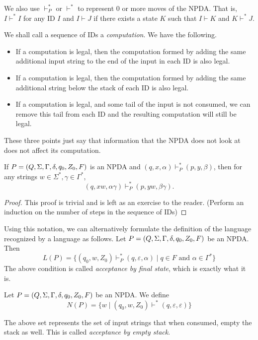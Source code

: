 We also use $\vdash^*_P$ or $\vdash^*$ to represent $0$ or more moves of the NPDA. That is, $I\vdash^* I$ for any ID $I$ and $I\vdash J$ if there exists a state $K$ such that $I\vdash K$ and $K\vdash^* J$.

\vspace{3mm}
We shall call a sequence of IDs a \textit{computation}. We have the following.
\begin{itemize}
    \item If a computation is legal, then the computation formed by adding the same additional input string to the end of the input in each ID is also legal.
    \item If a computation is legal, then the computation formed by adding the same additional string below the stack of each ID is also legal.
    \item If a computation is legal, and some tail of the input is not consumed, we can remove this tail from each ID and the resulting computation will still be legal.
\end{itemize}

These three points just say that information that the NPDA does not look at does not affect its computation.

\begin{theorem}
If $P=(Q,\Sigma,\Gamma,\delta,q_0,Z_0,F)$ is an NPDA and $(q,x,\alpha)\vdash^*_P(p,y,\beta)$, then for any strings $w\in\Sigma^*, \gamma\in\Gamma^*$, $$(q,xw,\alpha\gamma)\vdash^*_P(p,yw,\beta\gamma).$$
\end{theorem}
\begin{proof}
This proof is trivial and is left as an exercise to the reader. (Perform an induction on the number of steps in the sequence of IDs)
\end{proof}

Using this notation, we can alternatively formulate the definition of the language recognized by a language as follows.
Let $P=(Q,\Sigma,\Gamma,\delta,q_0,Z_0,F)$ be an NPDA. Then
$$L(P)=\{(q_0,w,Z_0)\vdash^*_P(q,\varepsilon,\alpha)\mid q\in F\text{ and }\alpha\in\Gamma^*\}$$
The above condition is called \textit{acceptance by final state}, which is exactly what it is.
\begin{definition}
Let $P=(Q,\Sigma,\Gamma,\delta,q_0,Z_0,F)$ be an NPDA. We define
$$N(P)=\{w\mid (q_0,w,Z_0)\vdash^*(q,\varepsilon,\varepsilon)\}$$
\end{definition}


The above set represents the set of input strings that when consumed, empty the stack as well. This is called \textit{acceptance by empty stack}.

